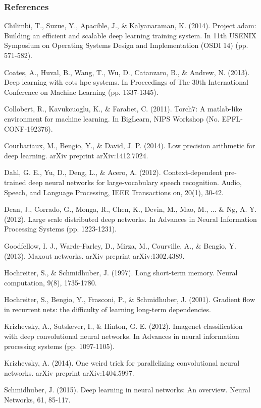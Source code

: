 \documentclass{article} %
\begin{document}
\subsubsection*{References}

\small{
	
Chilimbi, T., Suzue, Y., Apacible, J., \& Kalyanaraman, K. (2014). Project adam: Building an efficient and scalable deep learning training system. In 11th USENIX Symposium on Operating Systems Design and Implementation (OSDI 14) (pp. 571-582).

Coates, A., Huval, B., Wang, T., Wu, D., Catanzaro, B., \& Andrew, N. (2013). Deep learning with cots hpc systems. In Proceedings of The 30th International Conference on Machine Learning (pp. 1337-1345).

Collobert, R., Kavukcuoglu, K., \& Farabet, C. (2011). Torch7: A matlab-like environment for machine learning. In BigLearn, NIPS Workshop (No. EPFL-CONF-192376).

Courbariaux, M., Bengio, Y., \& David, J. P. (2014). Low precision arithmetic for deep learning. arXiv preprint arXiv:1412.7024.
	
Dahl, G. E., Yu, D., Deng, L., \& Acero, A. (2012). Context-dependent pre-trained deep neural networks for large-vocabulary speech recognition. Audio, Speech, and Language Processing, IEEE Transactions on, 20(1), 30-42.

Dean, J., Corrado, G., Monga, R., Chen, K., Devin, M., Mao, M., ... \& Ng, A. Y. (2012). Large scale distributed deep networks. In Advances in Neural Information Processing Systems (pp. 1223-1231).

Goodfellow, I. J., Warde-Farley, D., Mirza, M., Courville, A., \& Bengio, Y. (2013). Maxout networks. arXiv preprint arXiv:1302.4389.

Hochreiter, S., \& Schmidhuber, J. (1997). Long short-term memory. Neural computation, 9(8), 1735-1780.

Hochreiter, S., Bengio, Y., Frasconi, P., \& Schmidhuber, J. (2001). Gradient flow in recurrent nets: the difficulty of learning long-term dependencies.

Krizhevsky, A., Sutskever, I., \& Hinton, G. E. (2012). Imagenet classification with deep convolutional
neural networks. In Advances in neural information processing systems (pp. 1097-1105).

Krizhevsky, A. (2014). One weird trick for parallelizing convolutional neural networks. arXiv preprint
arXiv:1404.5997.

Schmidhuber, J. (2015). Deep learning in neural networks: An overview. Neural Networks, 61, 85-117.

}
\end{document}
